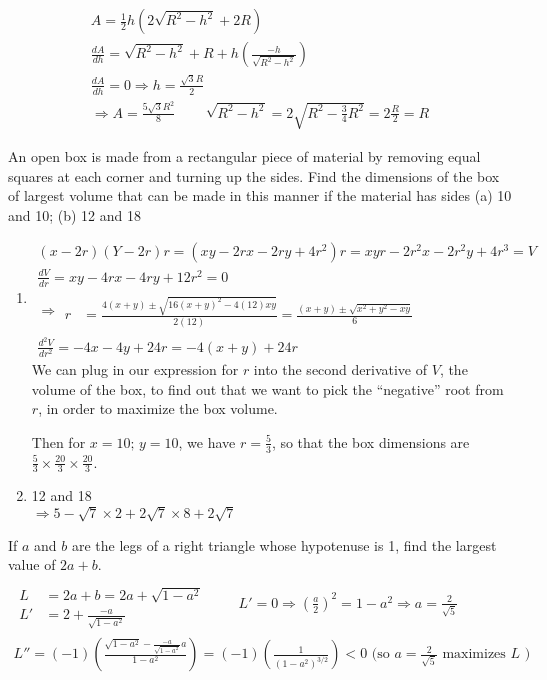 \documentclass[twoside]{amsart}
\theoremstyle{plain}
\theoremstyle{definition}
\newcommand{\exercisehead}[1]
  {\smallskip
   \noindent{\small\bf Exercise #1.}}
\begin{document}
\[
\begin{gathered}
  A = \frac{1}{2} h ( 2 \sqrt{ R^2 - h^2 } + 2R ) \\
  \frac{dA}{dh} = \sqrt{ R^2 -h^2 } + R + h \left( \frac{-h}{ \sqrt{ R^2-h^2 } } \right) \\
  \frac{dA}{dh} = 0 \Longrightarrow \boxed{ h = \frac{ \sqrt{3} R }{ 2 } } \\
  \Longrightarrow A = \frac{ 5\sqrt{3}R^2 }{ 8 } \quad \quad \, \sqrt{ R^2 - h^2 } = 2 \sqrt{ R^2 - \frac{3}{4} R^2 } = 2 \frac{R}{2} = \boxed{ R }
\end{gathered}
\]

\exercisehead{17} An open box is made from a rectangular piece of material by removing equal squares at each corner and turning up the sides.  Find the dimensions of the box of largest volume that can be made in this manner if the material has sides (a) 10 and 10; (b) 12 and 18

\begin{enumerate}
\item \[
\begin{gathered}
  (x-2r)(Y- 2r)r = (xy - 2rx - 2ry + 4r^2)r = xyr - 2r^2 x - 2r^2 y + 4r^3 = V \\
  \frac{dV}{dr} = xy - 4rx - 4ry + 12r^2 = 0 \\
\Longrightarrow   \begin{aligned}
  r & = \frac{ 4 (x+y) \pm \sqrt{ 16(x+y)^2 - 4 (12) xy } }{ 2(12) } = \frac{ (x+y) \pm \sqrt{ x^2 + y^2 - xy }}{ 6 } 
\end{aligned} \\
\frac{d^2 V}{dr^2} = -4x - 4 y + 24 r = -4(x+y) + 24r
\end{gathered}
\]
We can plug in our expression for $r$ into the second derivative of $V$, the volume of the box, to find out that we want to pick the ``negative'' root from $r$, in order to maximize the box volume.  

Then for $x=10; \, y = 10$, we have $r = \frac{5}{3}$, so that the box dimensions are $\frac{5}{3} \times \frac{20}{3} \times \frac{20}{3}$.  
\item 12 and 18 \\
$\Longrightarrow 5- \sqrt{7} \times 2 + 2 \sqrt{7} \times 8 + 2 \sqrt{7}$
\end{enumerate}

\exercisehead{18} If $a$ and $b$ are the legs of a right triangle whose hypotenuse is 1, find the largest value of $2a+b$.  
\[
\begin{gathered}
  \begin{aligned} \\
  L & = 2a + b = 2a + \sqrt{ 1 - a^2 } \\
  L' & = 2 + \frac{-a}{ \sqrt{ 1 - a^2 } }
\end{aligned} \quad \quad \, L' = 0 \Longrightarrow \left( \frac{a}{2} \right)^2 = 1 - a^2  \Longrightarrow a = \frac{2}{ \sqrt{5}} \\
  L'' = (-1) \left( \frac{ \sqrt{ 1 - a^2 } - \frac{ -a}{ \sqrt{ 1 - a^2 } } a }{ 1 - a^2 } \right) = (-1)\left( \frac{1}{ (1-a^2)^{3/2} } \right) < 0 \text{ (so $a = \frac{2}{\sqrt{5}}$ maximizes $L$ ) } 
\end{gathered}
\]
\end{document}
